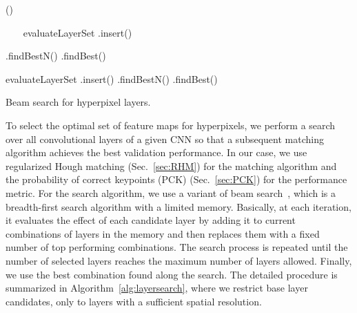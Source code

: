 \documentclass[10pt,twocolumn,letterpaper]{article}
\begin{document}
\begin{algorithm}[t]
    \Begin()
    {
		 \ \ \ \; 
        \ForAll{}
        {
             evaluateLayerSet\;
            .insert()\;
        }
        
        .findBestN()\; 
        .findBest()\; 
        
        {
            \;  
            \ForAll{}
            {
                \ForAll{}
                {
                    \If{}
                    {
                         evaluateLayerSet\;
                        .insert()\;
                    }
                }
            }
            .findBestN()\; 
            .findBest()\;
             \If{}
            {
                \;
            }
        }
        
        \Return{}
    }\vspace{-1.0mm}
\caption{Beam search for hyperpixel layers.}
\label{alg:layersearch}
\end{algorithm} 

To select the optimal set of feature maps for hyperpixels, we perform a search over all convolutional layers of a given CNN so that a subsequent matching algorithm achieves the best validation performance. In our case, we use regularized Hough matching (Sec.~\ref{sec:RHM}) for the matching algorithm and the probability of correct keypoints (PCK) (Sec.~\ref{sec:PCK}) for the performance metric. 
For the search algorithm, we use a variant of beam search~\cite{beamsearch}, which is a breadth-first search algorithm with a limited memory. 
Basically, at each iteration, it evaluates the effect of each candidate layer by adding it to current combinations of layers in the memory and then replaces them with a fixed number of top performing combinations.  
The search process is repeated until the number of selected layers reaches the maximum number of layers allowed. Finally, we use the best combination found along the search. 
The detailed procedure is summarized in Algorithm~\ref{alg:layersearch}, where we restrict base layer candidates,  only to layers with a sufficient spatial resolution. 
\end{document}
